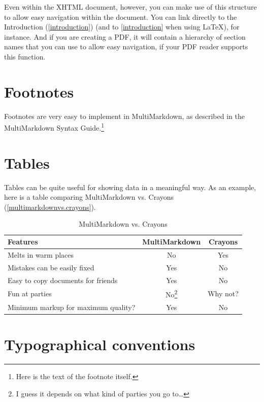 \documentclass[oneside,article]{memoir}
\begin{document}
Even within the XHTML document, however, you can make use of this structure to
allow easy navigation within the document. You can link directly to the
Introduction (\autoref{introduction}) (and to \autoref{introduction} when using LaTeX), for instance. And if you are creating a PDF, it will contain
a hierarchy of section names that you can use to allow easy navigation, if
your PDF reader supports this function.


\section{Footnotes}
\label{footnotes}

Footnotes are very easy to implement in MultiMarkdown, as described in the
MultiMarkdown Syntax Guide.\footnote{Here is the text of the footnote itself.}


\section{Tables}
\label{tables}

Tables can be quite useful for showing data in a meaningful way. As an
example, here is a table comparing MultiMarkdown vs. Crayons (\autoref{multimarkdownvs.crayons}).


\begin{table}[htbp]
\begin{minipage}{\linewidth}
\setlength{\tymax}{0.5\linewidth}
\centering
\small
\caption{MultiMarkdown vs. Crayons}
\label{multimarkdownvs.crayons}
\begin{tabulary}{\linewidth}{@{}lcc@{}} \\ \toprule 
Features&MultiMarkdown&Crayons \\\midrule
Melts in warm places&No&Yes \\
Mistakes can be easily fixed&Yes&No \\
Easy to copy documents for friends&Yes&No \\
Fun at parties&No\footnote{I guess it depends on what kind of parties you go to{\ldots}}&Why not? \\

		\bottomrule
	Minimum markup for maximum quality?&Yes&No \\

		\bottomrule
	\end{tabulary}
\end{minipage}
\end{table}

\section{Typographical conventions}
\label{typographicalconventions}
\end{document}
